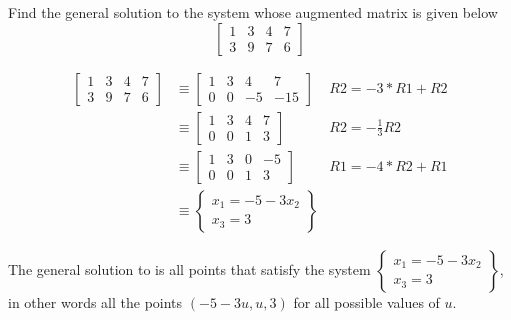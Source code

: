 \documentclass{../mathhomework}
\begin{document}
\pagebreak
\begin{problem}[1.2\#7]
    Find the general solution to the system whose augmented matrix is given below
    $$\begin{bmatrix}
        1 & 3 & 4 & 7 \\
        3 & 9 & 7 & 6
    \end{bmatrix}$$

    \begin{solution}
        \begin{align*}
            \begin{bmatrix}
                1 & 3 & 4 & 7 \\
                3 & 9 & 7 & 6
            \end{bmatrix}
            & \equiv
            \begin{bmatrix}
                1 & 3 & 4 & 7 \\
                0 & 0 & -5 & -15
            \end{bmatrix}
            & R2 = -3 * R1 + R2 \\ & \equiv
            \begin{bmatrix}
                1 & 3 & 4 & 7 \\
                0 & 0 & 1 & 3
            \end{bmatrix}
            & R2 = -\frac{1}{3} R2 \\ & \equiv
            \begin{bmatrix}
                1 & 3 & 0 & -5 \\
                0 & 0 & 1 & 3
            \end{bmatrix}
            & R1 = -4 * R2 + R1 \\ & \equiv
            \begin{Bmatrix}
                x_1 = -5 - 3x_2 \\
                x_3 = 3
            \end{Bmatrix}
        \end{align*}

        The general solution to is all points that satisfy the system $\begin{Bmatrix}
            x_1 = -5 - 3x_2 \\
            x_3 = 3
        \end{Bmatrix}$, in other words all the points $(-5 - 3u, u, 3)$ for all possible values of $u$.
    \end{solution}
\end{problem}
\end{document}
